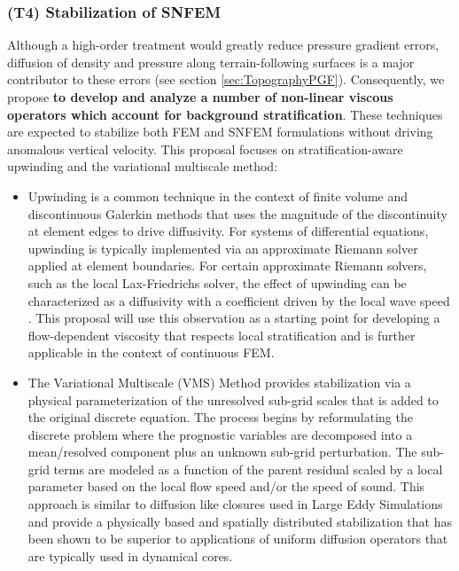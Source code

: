 \documentclass[11pt]{article}
\begin{document}
\subsubsection{(T4) Stabilization of SNFEM}

Although a high-order treatment would greatly reduce pressure gradient errors, diffusion of density and pressure along terrain-following surfaces is a major contributor to these errors (see section \ref{sec:TopographyPGF}).  Consequently, we propose \textbf{to develop and analyze a number of non-linear viscous operators which account for background stratification}.  These techniques are expected to stabilize both FEM and SNFEM formulations without driving anomalous vertical velocity.  This proposal focuses on stratification-aware upwinding and the variational multiscale method:

\vspace{-0.6cm}
\begin{itemize}
\item Upwinding is a common technique in the context of finite volume and discontinuous Galerkin methods that uses the magnitude of the discontinuity at element edges to drive diffusivity.  For systems of differential equations, upwinding is typically implemented via an approximate Riemann solver applied at element boundaries.  For certain approximate Riemann solvers, such as the local Lax-Friedrichs solver, the effect of upwinding can be characterized as a diffusivity with a coefficient driven by the local wave speed \cite{ullrich2014understanding}.  This proposal will use this observation as a starting point for developing a flow-dependent viscosity that respects local stratification and is further applicable in the context of continuous FEM.

\item The Variational Multiscale (VMS) Method provides stabilization via a physical parameterization of the unresolved sub-grid scales that is added to the original discrete equation. The process begins by reformulating the discrete problem where the prognostic variables are decomposed into a mean/resolved component plus an unknown sub-grid perturbation.  The sub-grid terms are modeled as a function of the parent residual scaled by a local parameter based on the local flow speed and/or the speed of sound. This approach is similar to diffusion like closures used in Large Eddy Simulations and provide a physically based and spatially distributed stabilization that has been shown to be superior to applications of uniform diffusion operators that are typically used in dynamical cores. \cite{hughes1998variational, marras2012variational, marras2013variational}
\end{itemize}
\end{document}
